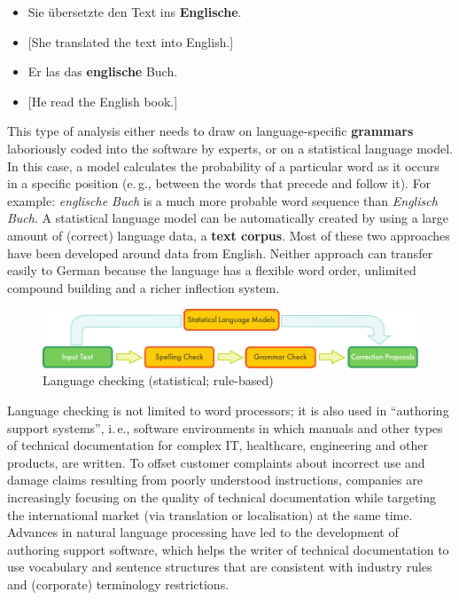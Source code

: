 \documentclass[]{../../metanetpaper}
\begin{document}
\begin{multicols}{2}
\begin{itemize}
\item Sie übersetzte den Text ins \textbf{Englische}.
\item {[}She translated the text into English.{]} 
\item Er las das \textbf{englische} Buch.
\item {[}He read the English book.{]}
\end{itemize}

This type of analysis either needs to draw on language-specific \textbf{grammars} laboriously coded into the software by experts, or on a statistical language model. In this case, a model calculates the probability of a particular word as it occurs in a specific position (e.\,g., between the words that precede and follow it). For example: \textit{englische Buch} is a much more probable word sequence than \textit{Englisch Buch}. A statistical language model can be automatically created by using a large amount of (correct) language data, a \textbf{text corpus}. Most of these two approaches have been developed around data from English. Neither approach can transfer easily to German because the language has a flexible word order, unlimited compound building and a richer inflection system.

\begin{figure}[htb]
  \center
  \includegraphics[width=\textwidth]{../_media/english/language_checking}
  \caption{Language checking (statistical; rule-based)}
  \label{fig:langcheckingaarch_en}
\end{figure}

Language checking is not limited to word processors; it is also used in “authoring support systems”, i.\,e., software environments in which manuals and other types of technical documentation for complex IT, healthcare, engineering and other products, are written. To offset customer complaints about incorrect use and damage claims resulting from poorly understood instructions, companies are increasingly focusing on the quality of technical documentation while targeting the international market (via translation or localisation) at the same time. Advances in natural language processing have led to the development of authoring support software, which helps the writer of technical documentation to use vocabulary and sentence structures that are consistent with industry rules and (corporate) terminology restrictions.


\end{multicols}
\end{document}
